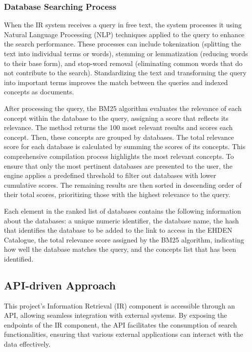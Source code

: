 \subsubsection{Database Searching Process}
\label{searchprocess}

When the IR system receives a query in free text, the system processes it using Natural Language Processing (NLP) techniques applied to the query to enhance the search performance. These processes can include tokenization (splitting the text into individual terms or words), stemming or lemmatization (reducing words to their base form), and stop-word removal (eliminating common words that do not contribute to the search). Standardizing the text and transforming the query into important terms improves the match between the queries and indexed concepts as documents.

After processing the query, the BM25 algorithm evaluates the relevance of each concept within the database to the query, assigning a score that reflects its relevance. The method returns the 100 most relevant results and scores each concept. Then, these concepts are grouped by databases. The total relevance score for each database is calculated by summing the scores of its concepts. This comprehensive compilation process highlights the most relevant concepts. To ensure that only the most pertinent databases are presented to the user, the engine applies a predefined threshold to filter out databases with lower cumulative scores. The remaining results are then sorted in descending order of their total scores, prioritizing those with the highest relevance to the query.

Each element in the ranked list of databases contains the following information about the databases: a unique numeric identifier, the database name, the hash that identifies the database to be added to the link to access in the EHDEN Catalogue, the total relevance score assigned by the BM25 algorithm, indicating how well the database matches the query, and the concepts list that has been identified.


\subsection{API-driven Approach}

This project's Information Retrieval (IR) component is accessible through an API, allowing seamless integration with external systems. By exposing the endpoints of the IR component, the API facilitates the consumption of search functionalities, ensuring that various external applications can interact with the data effectively.

